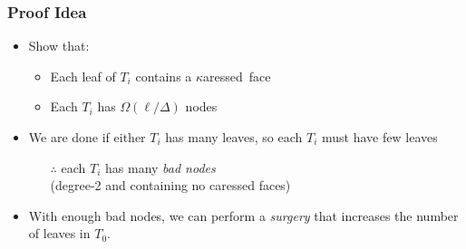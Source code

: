 \documentclass[xcolor=dvipsnames]{beamer}
\newcommand{\caressed}{$\kappa$aressed}
\newcommand{\dual}[1]{#1^\star}
\begin{document}
%

\begin{frame}
  \frametitle{Proof Idea}

  \begin{itemize}
    \item Show that:
    \begin{itemize}
      \item \alert<3->{Each leaf of $T_i$ contains a \caressed\ face}
      \item Each $T_i$ has $\Omega(\ell/\Delta)$ nodes
    \end{itemize}
    \item We are done if either $T_i$ has many leaves, so each $T_i$ must have few leaves
    \begin{itemize}
      \item[$\therefore$] each $T_i$ has many \emph{bad nodes} \\ (degree-2 and containing no caressed faces)
    \end{itemize}
    \item With enough bad nodes, we can perform a \emph{surgery} that increases the number of leaves in $T_0$.
  \end{itemize}
\end{frame}

% 
% 
% 
% 
\end{document}
